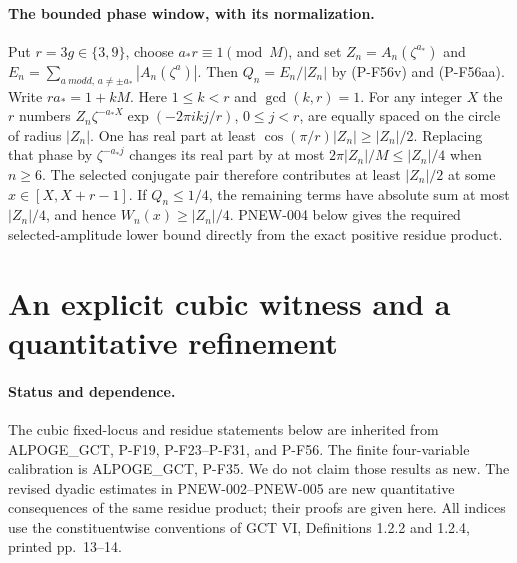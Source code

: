 \paragraph{The bounded phase window, with its normalization.}
Put $r=3g\in\{3,9\}$, choose $a_*r\equiv1\pmod M$, and set
$Z_n=A_n(\zeta^{a_*})$ and
$E_n=\sum_{a\ {
m odd},\,a\ne\pm a_*}|A_n(\zeta^a)|$.
Then $Q_n=E_n/|Z_n|$ by (P-F56v) and (P-F56aa).
Write $ra_*=1+kM$.  Here $1\le k<r$ and $\gcd(k,r)=1$.
For any integer $X$ the $r$ numbers
$Z_n\zeta^{-a_*X}\exp(-2\pi i k j/r)$, $0\le j<r$,
are equally spaced on the circle of radius $|Z_n|$.
One has real part at least $\cos(\pi/r)|Z_n|\ge |Z_n|/2$.
Replacing that phase by $\zeta^{-a_*j}$ changes its real part
by at most $2\pi|Z_n|/M\le |Z_n|/4$ when $n\ge6$.
The selected conjugate pair therefore contributes at least
$|Z_n|/2$ at some $x\in[X,X+r-1]$.
If $Q_n\le1/4$, the remaining terms have absolute sum at most
$|Z_n|/4$, and hence $W_n(x)\ge |Z_n|/4$.
PNEW-004 below gives the required selected-amplitude lower bound
directly from the exact positive residue product.



\section{An explicit cubic witness and a quantitative refinement}
\label{sec:plethysm-quantitative}

\paragraph{Status and dependence.}
The cubic fixed-locus and residue statements below are inherited from
ALPOGE\_GCT, P-F19, P-F23--P-F31, and P-F56.  The finite four-variable
calibration is ALPOGE\_GCT, P-F35.  We do not claim those results as new.
The revised dyadic estimates in PNEW-002--PNEW-005 are new quantitative
consequences of the same residue product; their proofs are given here.
All indices use the constituentwise conventions of GCT VI,
Definitions 1.2.2 and 1.2.4, printed pp.\ 13--14.

